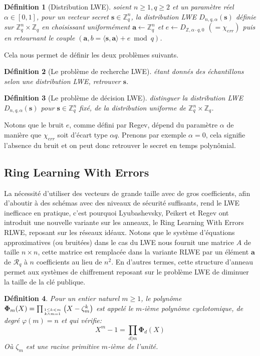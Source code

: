 \documentclass[11pt, headsepline, a4paper, fleqn, oneside]{article}
\newtheorem{defi}{Définition}
\newcommand{\Z}{\mathbb{Z}}
\begin{document}
\begin{defi}[Distribution LWE]
soient $n \geq 1, q \geq 2$ et un paramètre réel $\alpha \in[0,1]$, pour un vecteur secret $\boldsymbol{s}\in \Z_q ^n$, la distribution LWE $D_{n,q,\alpha}(\boldsymbol{s})$ définie sur $\Z_{q}^{n} \times \Z_{q}$ en choisissant uniformément $\boldsymbol{a} \leftarrow  \mathbb{Z}_{q}^{n}$ et $e \leftarrow D_{\mathbb{Z}, \alpha \cdot q, 0}$ $(=\chi_{err})$ puis en retournant le couple $(\boldsymbol{a}, b=\langle\boldsymbol{s}, \boldsymbol{a}\rangle+ e \bmod q)$.
\end{defi}
Cela nous permet de définir les deux problèmes suivants.
\begin{defi}[Le problème de recherche LWE]
étant donnés des échantillons selon une distribution LWE, retrouver $\boldsymbol{s}$.
\end{defi}
\begin{defi}[Le problème de décision LWE]
distinguer la distribution LWE $D_{n,q,\alpha}(\boldsymbol{s})$ pour $\boldsymbol{s}\in \Z_q ^n$ fixé, de la distribution uniforme de $\Z_{q}^{n} \times \Z_{q}$.
\end{defi}
Notons que le bruit $e$, comme défini par Regev, dépend du paramètre $\alpha$ de manière que $\chi_{err}$ soit d'écart type $\alpha q$. Prenons par exemple $\alpha = 0$, cela signifie l'absence du bruit et on peut donc retrouver le secret en temps polynômial.

\subsection{Ring Learning With Errors}
La nécessité d’utiliser des vecteurs de grande taille avec de gros coefficients, afin d'aboutir à des schémas avec des niveaux de sécurité suffisants, rend le LWE inefficace en pratique, c'est pourquoi Lyubashevsky, Peikert et Regev ont introduit une nouvelle variante sur les anneaux, le Ring Learning With Errors RLWE, reposant sur les réseaux idéaux.
Notons que le système d'équations approximatives (ou bruitées) dans le cas du LWE nous fournit une matrice $A$ de taille $n\times n$, cette matrice est remplacée dans la variante RLWE par un élément $\boldsymbol{a}$ de $\mathcal{R}_q$ à $n$ coefficients au lieu de $n^2$. En d'autres termes, cette structure d'anneau permet aux systèmes de chiffrement reposant sur le problème LWE de diminuer la taille de la clé publique. 
\begin{defi}
Pour un entier naturel $m\geq 1$, le polynôme \ $ \mathbf{\Phi}_{m}(X)=\prod_{1 \leq k<m \atop k \wedge m=1}\left(X-\zeta_{m}^{k}\right)$ est appelé le $m$-ième polynôme cyclotomique, de degré $\varphi(m)=n$ et qui vérifie:
$$X^{m}-1=\prod_{d | m} \mathbf{\Phi}_{d}(X)$$
Où $\zeta_{m}$ est une racine primitive $m$-ième de l'unité.
\end{defi}
\end{document}
